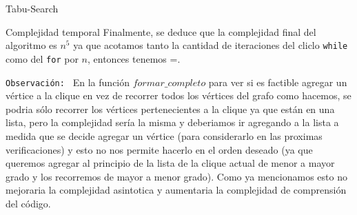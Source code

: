 \begin{section}{Tabu-Search}
\begin{subsection}{Complejidad temporal}
			 Finalmente, se deduce que la complejidad final del algoritmo es $n^5$ ya que acotamos tanto la cantidad de iteraciones del cliclo \texttt{while} como del \texttt{for} por $n$, entonces tenemos =.\Pa
			 
			 \texttt{Observación: } En la función $formar\_completo$ para ver si es factible agregar un vértice a la clique en vez de recorrer todos los vértices del grafo como hacemos, se podria sólo recorrer los vértices pertenecientes a la clique ya que están en una lista, pero la complejidad sería la misma y deberiamos ir agregando a la lista a medida que se decide agregar un vértice (para considerarlo en las proximas verificaciones) y esto no nos permite hacerlo en el orden deseado (ya que queremos agregar al principio de la lista de la clique actual de menor a mayor grado y los recorremos de mayor a menor grado). Como ya mencionamos esto no mejoraria la complejidad asintotica y aumentaria la complejidad de comprensión del código.
	\end{subsection}

\end{section}
